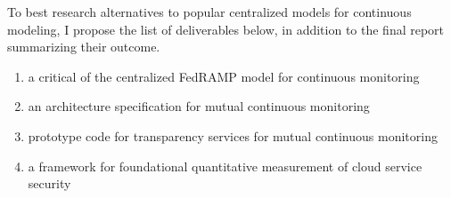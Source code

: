 \documentclass{jdf}
\begin{document}
To best research alternatives to popular centralized models for continuous modeling, I propose the list of deliverables below, in addition to the final report summarizing their outcome. 

\begin{enumerate}
    \item a critical of the centralized FedRAMP model for continuous monitoring
    \item an architecture specification for mutual continuous monitoring
    \item prototype code for transparency services for mutual continuous monitoring
    \item a framework for foundational quantitative measurement of cloud service security
\end{enumerate}



\end{document}
